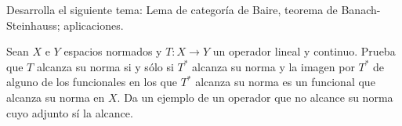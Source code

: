\documentclass[12pt]{article}
\begin{document}
    \begin{ejercicio}
        Desarrolla el siguiente tema: Lema de categoría de Baire, teorema de Banach-Steinhauss; aplicaciones.
    \end{ejercicio}

    \begin{ejercicio}[Extra]
        Sean $X$ e $Y$ espacios normados y $T \colon X \longrightarrow Y$ un operador lineal y continuo. Prueba que $T$ alcanza su norma si y sólo si $T^*$ alcanza su norma y la imagen por $T^*$ de alguno de los funcionales en los que $T^*$ alcanza su norma es un funcional que alcanza su norma en $X$. Da un ejemplo de un operador que no alcance su norma cuyo adjunto sí la alcance.
    \end{ejercicio}

    \newpage
    \setcounter{ejercicio}{0} %
    \noindent
\end{document}
